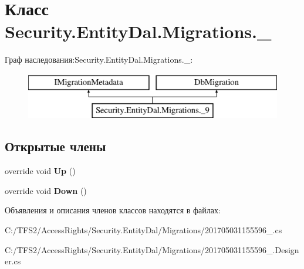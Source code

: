 \hypertarget{class_security_1_1_entity_dal_1_1_migrations_1_1__9}{}\section{Класс Security.\+Entity\+Dal.\+Migrations.\+\_}
\label{class_security_1_1_entity_dal_1_1_migrations_1_1__9}
Граф наследования\+:Security.\+Entity\+Dal.\+Migrations.\+\_\+:\begin{figure}[H]
\begin{center}
\leavevmode
\includegraphics[height=2.000000cm]{de/db9/class_security_1_1_entity_dal_1_1_migrations_1_1__9}
\end{center}
\end{figure}
\subsection*{Открытые члены}
\begin{DoxyCompactItemize}
\item 
\mbox{\label{class_security_1_1_entity_dal_1_1_migrations_1_1__9_ab44711c9bf5eafb5c69ea1537a29fa62}} 
override void {\bfseries Up} ()
\item 
\mbox{\label{class_security_1_1_entity_dal_1_1_migrations_1_1__9_a3362be91f6f65f8b66d2353b68b08c12}} 
override void {\bfseries Down} ()
\end{DoxyCompactItemize}


Объявления и описания членов классов находятся в файлах\+:\begin{DoxyCompactItemize}
\item 
C\+:/\+T\+F\+S2/\+Access\+Rights/\+Security.\+Entity\+Dal/\+Migrations/201705031155596\+\_.\+cs\item 
C\+:/\+T\+F\+S2/\+Access\+Rights/\+Security.\+Entity\+Dal/\+Migrations/201705031155596\+\_.\+Designer.\+cs\end{DoxyCompactItemize}

